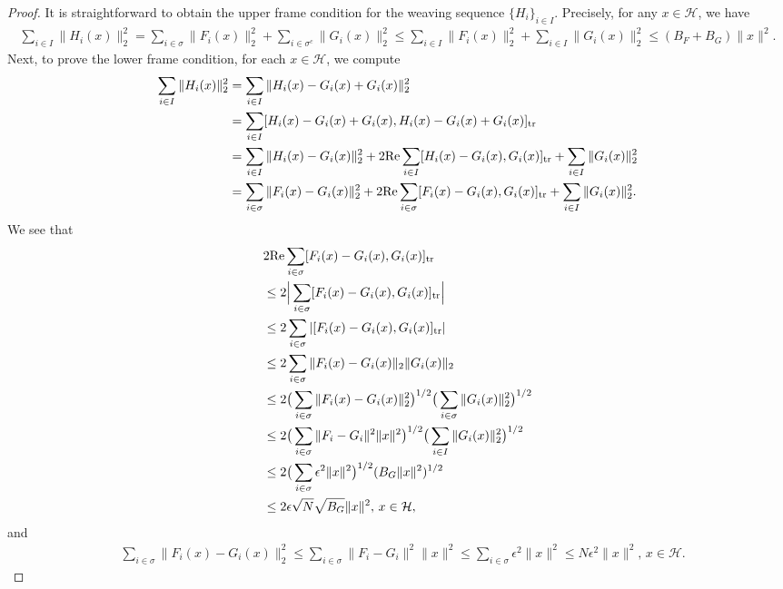 \documentclass[10pt,a4paper]{amsart}
\begin{document}
\begin{proof}
It is straightforward to obtain the upper frame condition for the weaving sequence $\{H_i\}_{i \in I}$. Precisely, for any $x \in \mathcal{H}$, we have
\begin{align*}
\sum_{i \in I} \|H_i(x)\|_2^2 =\sum_{i \in \sigma} \|F_i(x)\|_2^2 +\sum_{i \in \sigma^c} \|G_i(x)\|_2^2 \leq \sum_{i \in I} \|F_i(x)\|_2^2+\sum_{i \in I} \|G_i(x)\|_2^2 \leq (B_F + B_G)\|x\|^2.
\end{align*}
Next, to prove the lower frame condition, for each $x \in \mathcal{H}$, we compute
\begin{align}\label{eq2.1}
\sum_{i \in I} \|H_i(x)\|_2^2 &=\sum_{i \in I} \|H_i(x)-G_i(x)+G_i(x)\|_2^2\notag\\
& =\sum_{i \in I}[ H_i(x)-G_i(x)+G_i(x), H_i(x)-G_i(x)+G_i(x)]_{\text{tr}}\notag\\
&= \sum_{i \in I} \|H_i(x)-G_i(x)\|_2^2 + 2 \text{Re} \sum_{i \in I} [ H_i(x)-G_i(x), G_i(x) ]_{\text{tr}} + \sum_{i \in I} \|G_i(x)\|_2^2\notag\\
&= \sum_{i \in \sigma} \|F_i(x)-G_i(x)\|_2^2 + 2 \text{Re} \sum_{i \in \sigma} [ F_i(x)-G_i(x), G_i(x) ]_{\text{tr}} + \sum_{i \in I} \|G_i(x)\|_2^2.
\end{align}
We see that
\begin{align}\label{eq2.2}
&2 \text{Re} \sum_{i \in \sigma} [ F_i(x)-G_i(x), G_i(x) ]_{\text{tr}} \notag\\
& \leq 2 \Big|\sum_{i \in \sigma} [ F_i(x)-G_i(x), G_i(x) ]_{\text{tr}} \Big|\notag\\
& \leq 2 \sum_{i \in \sigma}| [ F_i(x)-G_i(x), G_i(x) ]_{\text{tr}}| \notag\\
& \leq 2 \sum_{i \in \sigma}\| F_i(x)-G_i(x)\|_2\| G_i(x)\|_2 \notag\\
&\leq 2 \big(\sum_{i \in \sigma}\| F_i(x)-G_i(x)\|_2^2\big)^{1/2}\big(\sum_{i \in \sigma}\| G_i(x)\|_2^2\big)^{1/2}\notag\\
& \leq 2 \big(\sum_{i \in \sigma}\| F_i-G_i\|^2\|x\|^2\big)^{1/2}\big(\sum_{i \in I}\| G_i(x)\|_2^2\big)^{1/2}\notag\\
&\leq 2 \big(\sum_{i \in \sigma}\epsilon^2\|x\|^2\big)^{1/2}(B_G\|x\|^2)^{1/2}\notag\\
& \leq 2\epsilon\sqrt{N} \sqrt{B_G}\|x\|^2, \, x \in \mathcal{H},
\end{align}
and
\begin{align}
&\sum_{i \in \sigma} \|F_i(x)-G_i(x)\|_2^2 \leq \sum_{i \in \sigma} \|F_i-G_i\|^2 \|x\|^2  \leq \sum_{i \in \sigma} \epsilon^2 \|x\|^2\leq N\epsilon^2 \|x\|^2, \, x \in \mathcal{H}. \label{eq2.3}

\end{align}
\end{proof}
\end{document}
